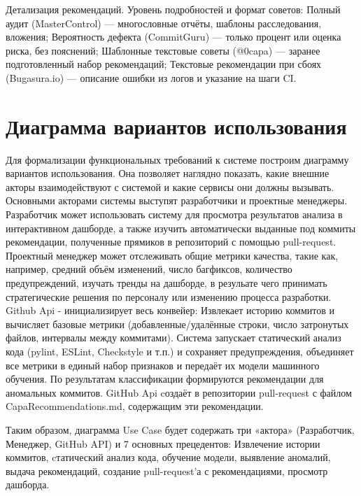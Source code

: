 Детализация рекомендаций. Уровень подробностей и формат советов: Полный аудит (MasterControl) — многословные отчёты, шаблоны расследования, вложения; Вероятность дефекта (CommitGuru) — только процент или оценка риска, без пояснений; Шаблонные текстовые советы (@0capa) — заранее подготовленный набор рекомендаций; Текстовые рекомендации при сбоях (Bugasura.io) — описание ошибки из логов и указание на шаги CI.



\section{Диаграмма вариантов использования} \label{ch1:sec5}
Для формализации функциональных требований к системе построим диаграмму вариантов использования. Она позволяет наглядно показать, какие внешние акторы взаимодействуют с системой и какие сервисы они должны вызывать.
Основными акторами системы выступят разработчики и проектные менеджеры.
Разработчик может использовать систему для просмотра результатов анализа в интерактивном дашборде, а также изучить автоматически выданные под коммиты рекомендации, полученные прямиков в репозиторий с помощью pull-request.
Проектный менеджер может отслеживать общие метрики качества, такие как, например, средний объём изменений, число багфиксов, количество предупреждений, изучать тренды на дашборде, в резульате чего принимать стратегические решения по персоналу или изменению процесса разработки. Github Api - инициализирует весь конвейер: Извлекает историю коммитов и вычисляет базовые метрики (добавленные/удалённые строки, число затронутых файлов, интервалы между коммитами). Система запускает статический анализ кода (pylint, ESLint, Checkstyle и т.п.) и сохраняет предупреждения, объединяет все метрики в единый набор признаков и передаёт их модели машинного обучения. По результатам классификации формируются рекомендации для аномальных коммитов. GitHub Api cоздаёт в репозитории pull-request с файлом CapaRecommendations.md, содержащим эти рекомендации.

Таким образом, диаграмма Use Case будет содержать три «актора» (Разработчик, Менеджер, GitHub API) и 7 основных прецедентов: Извлечение истории коммитов, cтатический анализ кода, обучение модели, выявление аномалий, выдача рекомендаций, создание pull-request’а с рекомендациями, просмотр дашборда.

